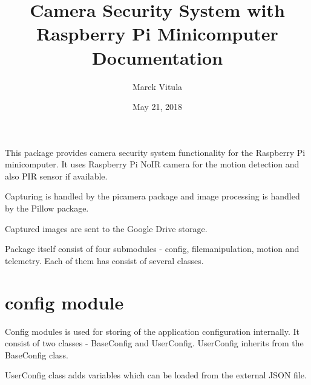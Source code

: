 \documentclass[letterpaper,10pt,english,openany]{sphinxmanual}
\title{Camera Security System with Raspberry Pi Minicomputer Documentation}
\date{May 21, 2018}
\author{Marek Vitula}
\begin{document}
\maketitle
\tableofcontents
{}\label{index::doc}


This package provides camera security system functionality for the Raspberry Pi minicomputer.
It uses Raspberry Pi NoIR camera for the motion detection and also PIR sensor if available.

Capturing is handled by the picamera package and image processing is handled by the Pillow package.

Captured images are sent to the Google Drive storage.

Package itself consist of four submodules - config, filemanipulation, motion and telemetry.
Each of them has consist of several classes.


\chapter{config module}
\label{index:config-module}\label{index:rpicameramon-package}
Config modules is used for storing of the application configuration internally.
It consist of two classes - BaseConfig and UserConfig. UserConfig inherits from the BaseConfig class.

UserConfig class adds variables which can be loaded from the external JSON file.
\label{index:module-rpicameramon.config}
\end{document}
